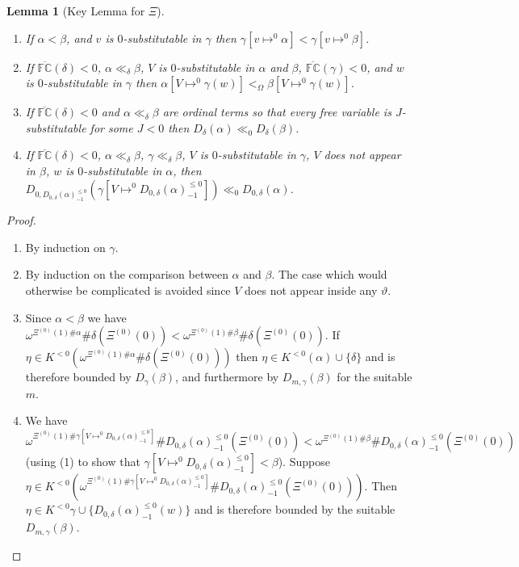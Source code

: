 \documentclass[11pt]{amsart}
\newtheorem{lemma}[theorem]{Lemma}
\theoremstyle{definition}
\begin{document}
\begin{lemma}[Key Lemma for $\Xi$]
  \begin{enumerate}
  \item If $\alpha<\beta$, and $v$ is $0$-substitutable in $\gamma$ then $\gamma[v\mapsto^0\alpha]<\gamma[v\mapsto^0\beta]$.
  \item If $\overline{\mathbb{FC}}(\delta)<0$, $\alpha\ll_\delta\beta$, $V$ is $0$-substitutable in $\alpha$ and $\beta$, $\overline{\mathbb{FC}}(\gamma)<0$, and $w$ is $0$-substitutable in $\gamma$ then $\alpha[V\mapsto^{0}\gamma(w)]<_\Omega\beta[V\mapsto^{0}\gamma(w)]$.
  \item If $\overline{\mathbb{FC}}(\delta)<0$ and $\alpha\ll_\delta\beta$ are ordinal terms so that every free variable is $J$-substitutable for some $J<0$ then $D_\delta(\alpha)\ll_0 D_\delta(\beta)$.
  \item If $\overline{\mathbb{FC}}(\delta)<0$, $\alpha\ll_\delta\beta$, $\gamma\ll_\delta\beta$, $V$ is $0$-substitutable in $\gamma$, $V$ does not appear in $\beta$, $w$ is $0$-substitutable in $\alpha$, then $D_{0,D_{0,\delta}(\alpha)^{\leq 0}_{-1}}(\gamma[V\mapsto^0 D_{0,\delta}(\alpha)^{\leq 0}_{-1}])\ll_0D_{0,\delta}(\alpha)$.
  \end{enumerate}
\end{lemma}
\begin{proof}
  \begin{enumerate}
  \item By induction on $\gamma$.
  \item By induction on the comparison between $\alpha$ and $\beta$. The case which would otherwise be complicated is avoided since $V$ does not appear inside any $\vartheta$.
  \item Since $\alpha<\beta$ we have $\omega^{\Xi^{(0)}(1)\#\alpha}\#\delta(\Xi^{(0)}(0))<\omega^{\Xi^{(0)}(1)\#\beta}\#\delta(\Xi^{(0)}(0))$. If $\eta\in K^{<0}(\omega^{\Xi^{(0)}(1)\#\alpha}\#\delta(\Xi^{(0)}(0)))$ then $\eta\in K^{<0}(\alpha)\cup \{\delta\}$ and is therefore bounded by $D_\gamma(\beta)$, and furthermore by $D_{m,\gamma}(\beta)$ for the suitable $m$.
    
  \item We have $\omega^{\Xi^{(0)}(1)\#\gamma[V\mapsto^0 D_{0,\delta}(\alpha)^{\leq 0}_{-1}]}\# D_{0,\delta}(\alpha)^{\leq 0}_{-1}(\Xi^{(0)}(0))<\omega^{\Xi^{(0)}(1)\#\beta}\# D_{0,\delta}(\alpha)^{\leq 0}_{-1}(\Xi^{(0)}(0))$ (using (1) to show that $\gamma[V\mapsto^0 D_{0,\delta}(\alpha)^{\leq 0}_{-1}]<\beta$). Suppose $\eta\in K^{<0}(\omega^{\Xi^{(0)}(1)\#\gamma[V\mapsto^0 D_{0,\delta}(\alpha)^{\leq 0}_{-1}]}\# D_{0,\delta}(\alpha)^{\leq 0}_{-1}(\Xi^{(0)}(0)))$. Then $\eta\in K^{<0}\gamma\cup\{D_{0,\delta}(\alpha)^{\leq 0}_{-1}(w)\}$ and is therefore bounded by the suitable $D_{m,\gamma}(\beta)$.    
  \end{enumerate}
\end{proof}
\end{document}
